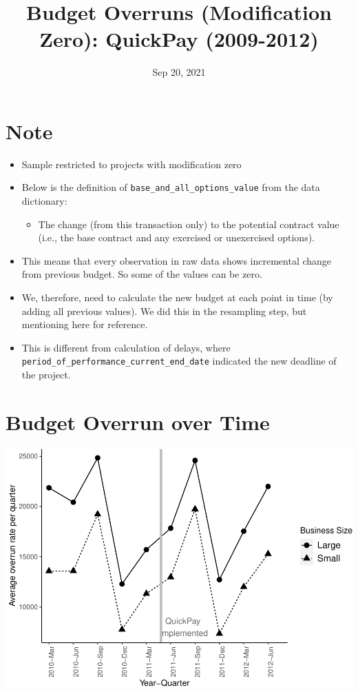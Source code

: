 \documentclass[
]{article}
\title{Budget Overruns (Modification Zero): QuickPay (2009-2012)}
\author{}
\date{\vspace{-2.5em}Sep 20, 2021}
\providecommand{\tightlist}{%
  \setlength{\itemsep}{0pt}\setlength{\parskip}{0pt}}
\begin{document}
\maketitle

\hypertarget{note}{%
\section{Note}\label{note}}

\begin{itemize}
\tightlist
\item
  Sample restricted to projects with modification zero
\item
  Below is the definition of \texttt{base\_and\_all\_options\_value}
  from the data dictionary:

  \begin{itemize}
  \tightlist
  \item
    The change (from this transaction only) to the potential contract
    value (i.e., the base contract and any exercised or unexercised
    options).
  \end{itemize}
\item
  This means that every observation in raw data shows incremental change
  from previous budget. So some of the values can be zero.
\item
  We, therefore, need to calculate the new budget at each point in time
  (by adding all previous values). We did this in the resampling step,
  but mentioning here for reference.
\item
  This is different from calculation of delays, where
  \texttt{period\_of\_performance\_current\_end\_date} indicated the new
  deadline of the project.
\end{itemize}

\hypertarget{budget-overrun-over-time}{%
\section{Budget Overrun over Time}\label{budget-overrun-over-time}}

\includegraphics{qp_first_budget_overrun_mod_zero_files/figure-latex/plot-1.pdf}
\end{document}
